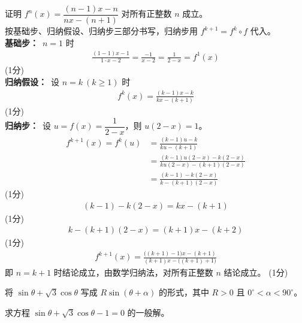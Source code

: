 \begin{solution}
    证明 $f^n(x)=\dfrac{(n-1)x-n}{nx-(n+1)}$ 对所有正整数 $n$ 成立。\\
    按基础步、归纳假设、归纳步三部分书写，归纳步用 $f^{k+1}=f^k\circ f$ 代入。\\
    \textbf{基础步：}\ $n=1$ 时
    \begin{align*}
        \frac{(1-1)x-1}{1\cdot x-2}=\frac{-1}{x-2}=\frac{1}{2-x}=f^1(x)
    \end{align*}
    \hfill (1分) \\
    \textbf{归纳假设：}\ 设 $n=k\ (k\ge1)$ 时
    \begin{align*}
        f^k(x)=\frac{(k-1)x-k}{kx-(k+1)}
    \end{align*}
    \hfill (1分) \\
    \textbf{归纳步：}\ 设 $u=f(x)=\dfrac{1}{2-x}$，则 $u(2-x)=1$。
    \begin{align*}
        f^{k+1}(x)=f^k(u)
        &=\frac{(k-1)u-k}{ku-(k+1)} \\
        &=\frac{(k-1)u(2-x)-k(2-x)}{ku(2-x)-(k+1)(2-x)} \\
        &=\frac{(k-1)-k(2-x)}{k-(k+1)(2-x)}
    \end{align*}
    \hfill (1分) \\
    \begin{align*}
        (k-1)-k(2-x)=kx-(k+1)
    \end{align*}
    \hfill (1分) \\
    \begin{align*}
        k-(k+1)(2-x)=(k+1)x-(k+2)
    \end{align*}
    \hfill (1分) \\
    \begin{align*}
        f^{k+1}(x)=\frac{\bigl((k+1)-1\bigr)x-(k+1)}{(k+1)x-\bigl((k+1)+1\bigr)}
    \end{align*}
    即 $n=k+1$ 时结论成立，由数学归纳法，对所有正整数 $n$ 结论成立。 \hfill (1分)
\end{solution}

\begin{question}[points = 6]
    \begin{questionparts}
        \item 将 $\sin\theta+\sqrt3\cos\theta$ 写成 $R\sin(\theta+\alpha)$ 的形式，其中 $R>0$ 且 $0^\circ<\alpha<90^\circ$。 

        \item 求方程 $\sin\theta+\sqrt3\cos\theta-1=0$ 的一般解。 
    \end{questionparts}
\end{question}

